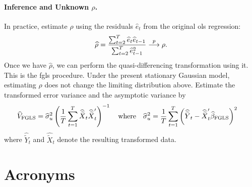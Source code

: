 \documentclass[a4paper,12pt]{article}
\begin{document}
\paragraph{Inference and Unknown \texorpdfstring{$\rho$}{rho}.}
In practice, estimate $\rho$ using the residuals $\widehat e_t$ from the original \gls{ols} regression:
\begin{align}
	\widehat\rho=\frac{\sum_{t=2}^T\widehat e_t\widehat e_{t-1}}
	{\sum_{t=2}^T\widehat e_{t-1}^2}\overset{p}{\longrightarrow}\rho.
\end{align}
Once we have $\widehat\rho$, we can perform the quasi-differencing transformation using it.
This is the \gls{fgls} procedure.
Under the present stationary Gaussian model, estimating $\rho$ does not change the limiting distribution above.
Estimate the transformed error variance and the asymptotic variance by
\begin{align}
	\widehat V_{\mathrm{FGLS}}
	&=\widehat\sigma_u^2\left(\frac1T\sum_{t=1}^T
	\widehat{\widetilde X}_t\widehat{\widetilde X}_t^{\prime}\right)^{-1}
	\quad\text{where}\quad
	\widehat\sigma_u^2
	=\frac1{T}\sum_{t=1}^T
	\left(\widehat{\widetilde Y}_t-\widehat{\widetilde X}_t^{\prime}\widehat\beta_{\mathrm{FGLS}}\right)^2
\end{align}
where $\widehat{\widetilde Y}_t$ and $\widehat{\widetilde X}_t$ denote the resulting transformed data.

\vfill
\section*{Acronyms}
\printglossaries
\end{document}
